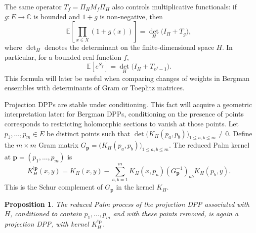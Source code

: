 \documentclass[12pt,a4paper,reqno]{article}
\theoremstyle{thmstyleone}
\newtheorem{proposition}[theorem]{Proposition}
\theoremstyle{thmstylethree}
\theoremstyle{thmstyletwo}
\newtheorem{remark}[theorem]{Remark}
\numberwithin{equation}{subsection}
\def\leq{\leqslant}
\begin{document}

The same operator $T_f=\Pi_HM_f\Pi_H$ also controls multiplicative functionals: if $g:E\to\mathbb C$ is bounded and $1+g$ is non-negative, then
\begin{equation}\label{eq:mult-functional}
\mathbb E\left[\prod_{x\in X}(1+g(x))\right]=\det_H\big(I_H+T_g\big),
\end{equation}
where $\det_H$ denotes the determinant on the finite-dimensional space $H$. In particular, for a bounded real function $f$,
\begin{equation}\label{eq:exp-lin-stat}
\mathbb E\left[e^{S_f}\right]=\det_H\big(I_H+T_{e^f-1}\big).
\end{equation}
This formula will later be useful when comparing changes of weights in Bergman ensembles with determinants of Gram or Toeplitz matrices.

Projection DPPs are stable under conditioning. This fact will acquire a geometric interpretation later: for Bergman DPPs, conditioning on the presence of points corresponds to restricting holomorphic sections to vanish at those points. Let $p_1,\ldots,p_m\in E$ be distinct points such that $\det\big(K_H(p_a,p_b)\big)_{1\leq a,b\leq m}\neq 0.$ Define the $m\times m$ Gram matrix $G_{\mathbf p}=\big(K_H(p_a,p_b)\big)_{1\leq a,b\leq m}.$ The reduced Palm kernel at $\mathbf p=(p_1,\ldots,p_m)$ is
\[
    K_H^{!\mathbf p}(x,y)=K_H(x,y)-\sum_{a,b=1}^mK_H(x,p_a)(G_{\mathbf p}^{-1})_{ab}K_H(p_b,y).
\]
This is the Schur complement of $G_{\mathbf p}$ in the kernel $K_H$.

\begin{proposition}\label{prop:palm-projection-DPP}
The reduced Palm process of the projection DPP associated with $H$, conditioned to contain $p_1,\ldots,p_m$ and with these points removed, is again a projection DPP, with kernel $K_H^{!\mathbf p}$.
\end{proposition}

\end{document}
